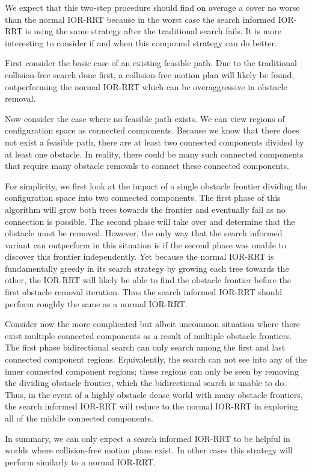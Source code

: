 We expect that this two-step procedure should find on average a cover no worse than the normal IOR-RRT because in the worst case the search informed IOR-RRT is using the same strategy after the traditional search fails. It is more interesting to consider if and when this compound strategy can do better. 

First consider the basic case of an existing feasible path. Due to the traditional collision-free search done first, a collision-free motion plan will likely be found, outperforming the normal IOR-RRT which can be overaggressive in obstacle removal. 

Now consider the case where no feasible path exists. We can view regions of configuration space as connected components. Because we know that there does not exist a feasible path, there are at least two connected components divided by at least one obstacle. In reality, there could be many such connected components that require many obstacle removals to connect these connected components. 

For simplicity, we first look at the impact of a single obstacle frontier dividing the configuration space into two connected components. The first phase of this algorithm will grow both trees towards the frontier and eventually fail as no connection is possible. The second phase will take over and determine that the obstacle must be removed. However, the only way that the search informed variant can outperform in this situation is if the second phase was unable to discover this frontier independently. Yet because the normal IOR-RRT is fundamentally greedy in its search strategy by growing each tree towards the other, the IOR-RRT will likely be able to find the obstacle frontier before the first obstacle removal iteration. Thus the search informed IOR-RRT should perform roughly the same as a normal IOR-RRT.

Consider now the more complicated but albeit uncommon situation where there exist multiple connected components as a result of multiple obstacle frontiers. The first phase bidirectional search can only search among the first and last connected component regions. Equivalently, the search can not see into any of the inner connected component regions; these regions can only be seen by removing the dividing obstacle frontier, which the bidirectional search is unable to do. Thus, in the event of a highly obstacle dense world with many obstacle frontiers, the search informed IOR-RRT will reduce to the normal IOR-RRT in exploring all of the middle connected components. 

In summary, we can only expect a search informed IOR-RRT to be helpful in worlds where collision-free motion plans exist. In other cases this strategy will perform similarly to a normal IOR-RRT.
